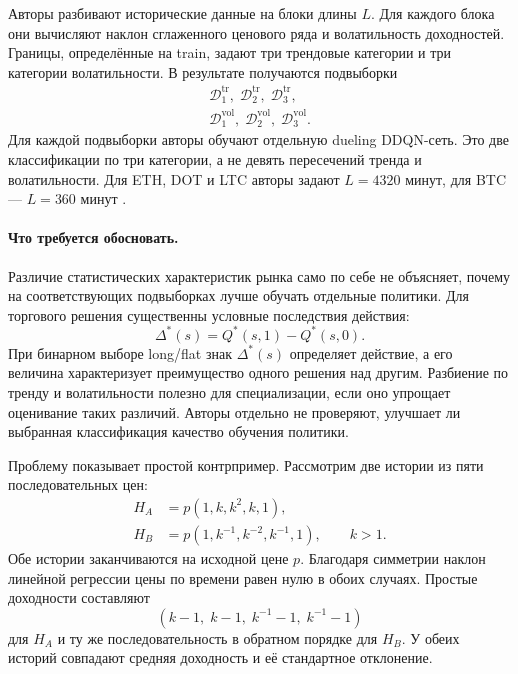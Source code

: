 \documentclass[9pt,a4paper,twocolumn]{extarticle}
\begin{document}
Авторы разбивают исторические данные на блоки длины $L$. Для каждого блока они вычисляют наклон
сглаженного ценового ряда и волатильность доходностей. Границы, определённые на train, задают
три трендовые категории и три категории волатильности. В результате получаются подвыборки
\begin{equation}
\begin{aligned}
  \mathcal D^{\mathrm{tr}}_1,\;
  \mathcal D^{\mathrm{tr}}_2,\;
  \mathcal D^{\mathrm{tr}}_3,\\
  \mathcal D^{\mathrm{vol}}_1,\;
  \mathcal D^{\mathrm{vol}}_2,\;
  \mathcal D^{\mathrm{vol}}_3.
\end{aligned}
\label{eq:regime_subsets}
\end{equation}
Для каждой подвыборки авторы обучают отдельную dueling DDQN-сеть. Это две классификации по три
категории, а не девять пересечений тренда и волатильности. Для ETH, DOT и LTC авторы задают
$L=4320$ минут, для BTC --- $L=360$ минут \cite{zong2024macrohft}.

\paragraph{Что требуется обосновать.}

Различие статистических характеристик рынка само по себе не объясняет, почему на соответствующих
подвыборках лучше обучать отдельные политики. Для торгового решения существенны условные
последствия действия:
\begin{equation}
  \Delta^*(s)
  =
  Q^*(s,1)-Q^*(s,0).
  \label{eq:optimal_action_difference}
\end{equation}
При бинарном выборе long/flat знак $\Delta^*(s)$ определяет действие, а его величина
характеризует преимущество одного решения над другим. Разбиение по тренду и волатильности
полезно для специализации, если оно упрощает оценивание таких различий. Авторы отдельно не
проверяют, улучшает ли выбранная классификация качество обучения политики.

Проблему показывает простой контрпример. Рассмотрим две истории из пяти последовательных цен:
\begin{equation}
\begin{aligned}
  H_A &= p(1,k,k^2,k,1),\\
  H_B &= p(1,k^{-1},k^{-2},k^{-1},1),
  \qquad k>1.
\end{aligned}
\label{eq:matched_histories}
\end{equation}
Обе истории заканчиваются на исходной цене $p$. Благодаря симметрии наклон линейной регрессии
цены по времени равен нулю в обоих случаях. Простые доходности составляют
\[
  (k-1,\;k-1,\;k^{-1}-1,\;k^{-1}-1)
\]
для $H_A$ и ту же последовательность в обратном порядке для $H_B$. У обеих историй совпадают
средняя доходность и её стандартное отклонение.
\end{document}
